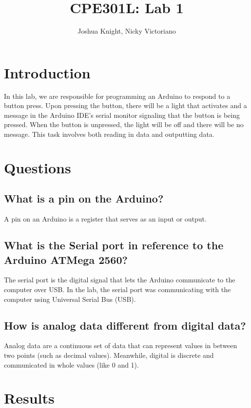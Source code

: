 \documentclass{article}
\title{CPE301L: Lab 1}
\author{Joshua Knight, Nicky Victoriano}
\begin{document}
\maketitle

\section{Introduction}

In this lab, we are responsible for programming an Arduino to respond to a button press. Upon pressing the button, there will be a light that activates and a message in the Arduino IDE's serial monitor signaling that the button is being pressed. When the button is unpressed, the light will be off and there will be no message. This task involves both reading in data and outputting data.

\section{Questions}

\subsection{What is a pin on the Arduino?}

A pin on an Arduino is a register that serves as an input or output.

\subsection{What is the Serial port in reference to the Arduino ATMega 2560?}

The serial port is the digital signal that lets the Arduino communicate to the computer over USB. In the lab, the serial port was communicating with the computer using Universal Serial Bus (USB).

\subsection{How is analog data different from digital data?}

Analog data are a continuous set of data that can represent values in between two points (such as decimal values). Meanwhile, digital is discrete and communicated in whole values (like 0 and 1).

\section{Results}
\end{document}
